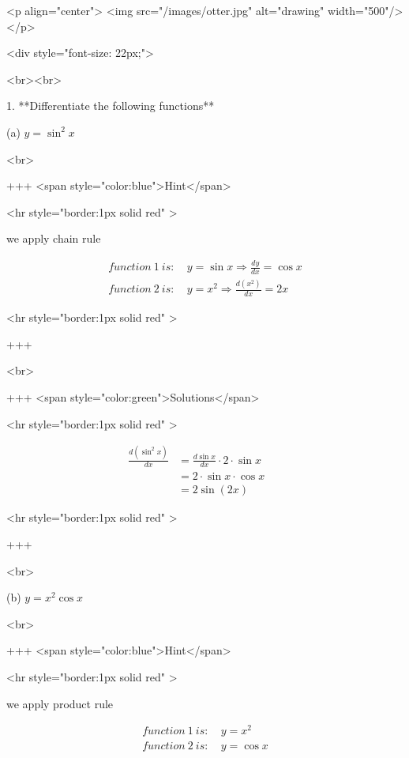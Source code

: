 <p align="center">
<img src="/images/otter.jpg" alt="drawing" width="500"/>
</p>

<div style="font-size: 22px;">

<br><br>

1. **Differentiate the following functions**

(a) $y=\sin ^{2} x$

<br>

+++ <span style="color:blue">Hint</span>

<hr style="border:1px solid red" >

we apply chain rule

\begin{equation}
\begin{aligned}
function\ 1\ is:\ &y=\sin x \Rightarrow \frac{d y}{d x}=\cos x \\
function\ 2\ is:\ &y=x^2 \Rightarrow \frac{d\left(x^2\right)}{d x}=2 x
\end{aligned}
\end{equation}

<hr style="border:1px solid red" >

+++

<br>

+++ <span style="color:green">Solutions</span>

<hr style="border:1px solid red" >

\begin{equation}
\begin{aligned}
\frac{d\left(\sin ^2 x\right)}{d x} &= \frac{d \sin x }  {d x} \cdot 2 \cdot \sin x \\
&=2 \cdot \sin x \cdot \cos x \\
&=2 \sin (2 x)&&
\end{aligned}
\end{equation}

<hr style="border:1px solid red" >

+++

<br>

(b) $y=x^{2} \cos x$

<br>

+++ <span style="color:blue">Hint</span>

<hr style="border:1px solid red" >

we apply product rule

\begin{equation}
\begin{aligned}
function\ 1\ is:\ &y=x^2 \\
function\ 2\ is:\ &y=\cos x \\
\end{aligned}
\end{equation}

